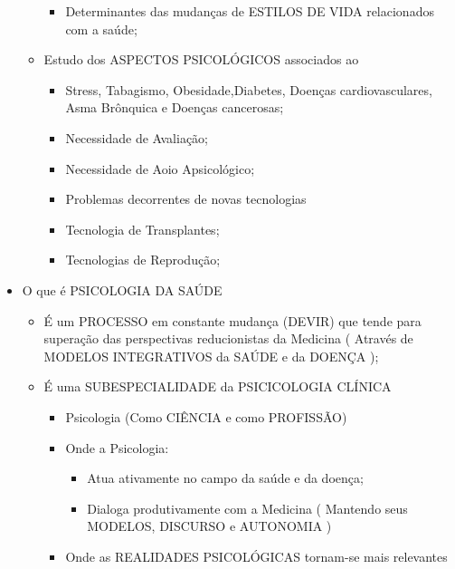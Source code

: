\documentclass[
]{book}
\providecommand{\tightlist}{%
  \setlength{\itemsep}{0pt}\setlength{\parskip}{0pt}}
\begin{document}
\begin{itemize}
\begin{itemize}
    \begin{itemize}
    \tightlist
    \item
      Determinantes das mudanças de ESTILOS DE VIDA relacionados com a
      saúde;
    \end{itemize}
  \item
    Estudo dos ASPECTOS PSICOLÓGICOS associados ao

    \begin{itemize}
    \tightlist
    \item
      Stress, Tabagismo, Obesidade,Diabetes, Doenças cardiovasculares,
      Asma Brônquica e Doenças cancerosas;
    \item
      Necessidade de Avaliação;
    \item
      Necessidade de Aoio Apsicológico;
    \item
      Problemas decorrentes de novas tecnologias
    \item
      Tecnologia de Transplantes;
    \item
      Tecnologias de Reprodução;
    \end{itemize}
  \end{itemize}
\item
  O que é PSICOLOGIA DA SAÚDE

  \begin{itemize}
  \tightlist
  \item
    É um PROCESSO em constante mudança (DEVIR) que tende para superação
    das perspectivas reducionistas da Medicina ( Através de MODELOS
    INTEGRATIVOS da SAÚDE e da DOENÇA );
  \item
    É uma SUBESPECIALIDADE da PSICICOLOGIA CLÍNICA

    \begin{itemize}
    \tightlist
    \item
      Psicologia (Como CIÊNCIA e como PROFISSÃO)
    \item
      Onde a Psicologia:

      \begin{itemize}
      \tightlist
      \item
        Atua ativamente no campo da saúde e da doença;
      \item
        Dialoga produtivamente com a Medicina ( Mantendo seus MODELOS,
        DISCURSO e AUTONOMIA )
      \end{itemize}
    \item
      Onde as REALIDADES PSICOLÓGICAS tornam-se mais relevantes


\end{itemize}
\end{itemize}
\end{itemize}
\end{document}
